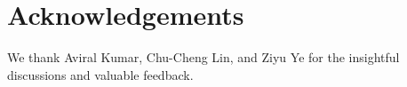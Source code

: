 \section*{Acknowledgements}
We thank Aviral Kumar, Chu-Cheng Lin, and Ziyu Ye for the insightful discussions and valuable feedback.